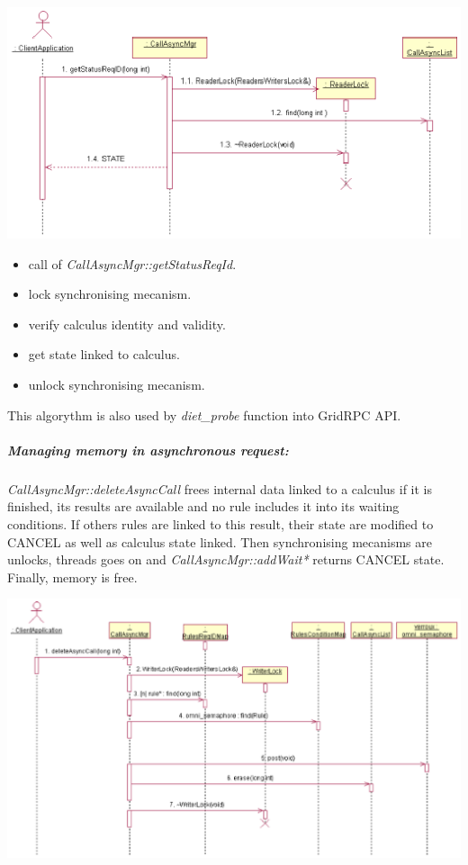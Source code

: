   \begin{center}
  \includegraphics{./fig/CallAsyncProbeSequenceDiagram1.ps}
  \end{center}

  \begin{itemize}
  \item call of \emph{CallAsyncMgr::getStatusReqId}.
  \item lock synchronising mecanism.
  \item verify calculus identity and validity.
  \item get state linked to calculus.
  \item unlock synchronising mecanism.
  \end{itemize}

  \noindent
   This algorythm is also used by \emph{diet\_probe} function
  into GridRPC API.

  \subparagraph{Managing memory in asynchronous request:}
  \emph{CallAsyncMgr::deleteAsyncCall} frees internal data linked to a
  calculus if it is finished, its results are available and no rule includes
  it into its waiting conditions.
  If others rules are linked to this result, their state are modified to
  CANCEL as well as calculus state linked. Then synchronising mecanisms
  are unlocks, threads goes on and \emph{CallAsyncMgr::addWait*} returns
  CANCEL state. Finally, memory is free.

  \begin{center}
  \includegraphics{./fig/DietCancelSequenceDiagram.ps}
  \end{center}

